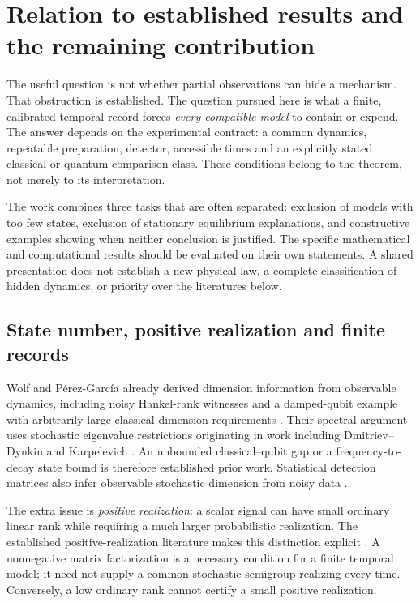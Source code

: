 \chapter{Relation to established results and the remaining contribution}
\label{ch:rf-positioning}

The useful question is not whether partial observations can hide a mechanism.
That obstruction is established. The question pursued here is what a finite,
calibrated temporal record forces \emph{every compatible model} to contain or
expend. The answer depends on the experimental contract: a common dynamics,
repeatable preparation, detector, accessible times and an explicitly stated
classical or quantum comparison class. These conditions belong to the theorem,
not merely to its interpretation.

The work combines three tasks that are often separated: exclusion of models
with too few states, exclusion of stationary equilibrium explanations, and
constructive examples showing when neither conclusion is justified. The
specific mathematical and computational results should be evaluated on their
own statements. A shared presentation does not establish a new physical law,
a complete classification of hidden dynamics, or priority over the literatures
below.

\section{State number, positive realization and finite records}

Wolf and P\'erez-Garc\'ia already derived dimension information from observable
dynamics, including noisy Hankel-rank witnesses and a damped-qubit example
with arbitrarily large classical dimension requirements \cite{rrWolf2009}.
Their spectral argument uses stochastic eigenvalue restrictions originating
in work including Dmitriev--Dynkin and Karpelevich
\cite{rfDmitriev1946,rfKarpelevich1951}. An unbounded classical--qubit gap or a
frequency-to-decay state bound is therefore established prior work. Statistical
detection matrices also infer observable stochastic dimension from noisy data
\cite{rfSuccar2024}.

The extra issue is \emph{positive realization}: a scalar signal can have small
ordinary linear rank while requiring a much larger probabilistic realization.
The established positive-realization literature makes this distinction
explicit \cite{rfBenvenuti2022}. A nonnegative matrix factorization is a
necessary condition for a finite temporal model; it need not supply a common
stochastic semigroup realizing every time. Conversely, a low ordinary rank
cannot certify a small positive realization.

